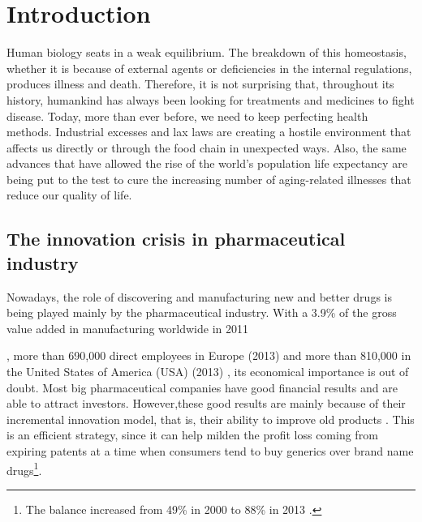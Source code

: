 \chapter{Introduction}


Human biology seats in a weak equilibrium. The breakdown of this homeostasis, whether it is because of external agents or deficiencies in the internal regulations, produces illness and death. Therefore, it is not surprising that, throughout its history, humankind has always been looking for treatments and medicines to fight disease. 
Today, more than ever before, we need to keep perfecting health methods. Industrial excesses and lax laws are creating a hostile environment that affects us directly or through the food chain in unexpected ways. Also, the same advances that have allowed the rise of the world's population life expectancy \cite{who_world_????} are being put to the test to cure the increasing number of aging-related illnesses that reduce our quality of life.

\section{The innovation crisis in pharmaceutical industry}

Nowadays, the role of discovering and manufacturing new and better drugs is being played mainly by the pharmaceutical industry. With a 3.9\% of the gross value added in manufacturing worldwide in 2011  \cite{ostwald_measuring_2013}, more than 690,000 direct employees in Europe (2013) \cite{efpia_pharmaceutical_2014} and more than 810,000 in the United States of America (USA) (2013) \cite{phrma_2015_2015}, its economical importance is out of doubt. Most big pharmaceutical companies have good financial results and are able to attract investors. However,these good results are mainly because of their incremental innovation model, that is, their ability to improve old products \cite{kristopher_hult_should_????}. This is an efficient strategy, since it can help milden the profit loss coming from expiring patents at a time when consumers tend to buy generics over brand name drugs\footnote{The balance increased from 49\% in 2000  to 88\% in 2013 \cite{phrma_2015_2015}.}. 

